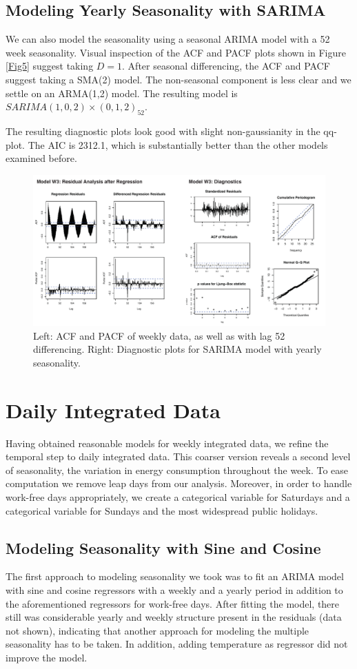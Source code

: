 \documentclass[conference]{IEEEtran}
\begin{document}
\subsection{Modeling Yearly Seasonality with SARIMA}
We can also model the seasonality using a seasonal ARIMA model with a 52 week seasonality. Visual inspection of the ACF and PACF plots shown in Figure \ref{Fig5} suggest taking $D=1$. After seasonal differencing, the ACF and PACF suggest taking a SMA(2) model. The non-seasonal component is less clear and we settle on an ARMA(1,2) model. The resulting model is $SARIMA(1,0,2)\times(0,1,2)_{52}$. 
\par
The resulting diagnostic plots look good with slight non-gaussianity in the qq-plot. The AIC is 2312.1, which is substantially better than the other models examined before.
\begin{figure}[ht]
	\centering
	\includegraphics[width=1\textwidth]{Figs/Fig5.pdf}
	\caption{Left: ACF and PACF of weekly data, as well as with lag 52 differencing. Right: Diagnostic plots for SARIMA model with yearly seasonality. }
	\label{weekly_mod2}
\end{figure}


\section{Daily Integrated Data}
Having obtained reasonable models for weekly integrated data, we refine the temporal step to daily integrated data. This coarser version reveals a second level of seasonality, the variation in energy consumption throughout the week. To ease computation we remove leap days from our analysis. Moreover, in order to handle work-free days appropriately, we create a categorical variable for Saturdays and a categorical variable for Sundays and the most widespread public holidays. 

\subsection{Modeling Seasonality with Sine and Cosine}
The first approach to modeling seasonality we took was to fit an ARIMA model with sine and cosine regressors with a weekly and a yearly period in addition to the aforementioned regressors for work-free days. After fitting the model, there still was considerable yearly and weekly structure present in the residuals (data not shown), indicating that another approach for modeling the multiple seasonality has to be taken. In addition, adding temperature as regressor did not improve the model. 
\end{document}

